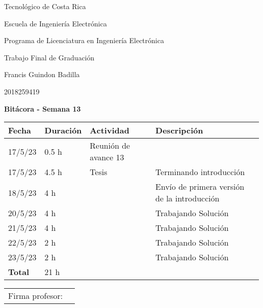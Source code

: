\documentclass[12pt,oneside]{book}
\begin{document}
 \graphicspath{{./}{../tesis/fig/}}
  Tecnológico de Costa Rica
  \par\vspace{1mm}
  Escuela de Ingeniería Electrónica
  \par\vspace{1mm}
  Programa de Licenciatura en Ingeniería Electrónica
  \par\vspace{10mm}
  Trabajo Final de Graduación
  \par\vspace{1mm}
  Francis Guindon Badilla
  \par\vspace{1mm}
  2018259419
  \par\vspace{10mm}
  \large\textbf{Bitácora - Semana 13}
  \par\vspace{10mm}
  \small

  \begin{table} [!h]
    \centering
    \small
    \begin{tabular}{p{1.5 cm} p{2.1 cm} p{5 cm} p{8 cm}}
      \hline
      Fecha & Duración & Actividad & Descripción \\
      \hline
      17/5/23 & 0.5 h & Reunión de avance 13 & \\
      17/5/23 & 4.5 h & Tesis & Terminando introducción \\
      18/5/23 & 4 h & & Envío de primera versión de la introducción \\
      20/5/23 & 4 h & & Trabajando Solución \\
      21/5/23 & 4 h & & Trabajando Solución \\
      22/5/23 & 2 h & & Trabajando Solución \\
      23/5/23 & 2 h & & Trabajando Solución \\
      \hline
      \textbf{Total} & 21 h \\
      \hline
    \end{tabular}
  \end{table}
  
  \vfill

  \begin{tabular}{p{3 cm} p{10 cm}}
    Firma profesor: & \\
    \cline{2-2}
  \end{tabular}

  \newpage
\end{document}
